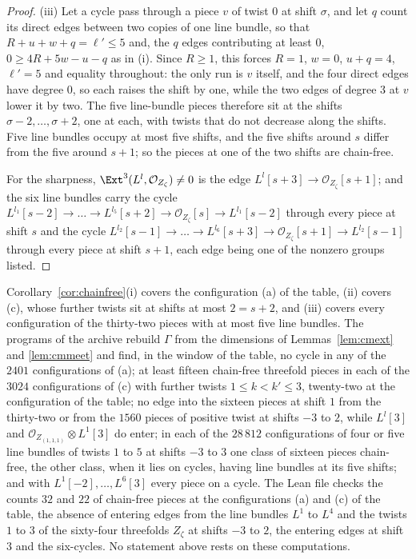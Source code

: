 \begin{proof}
(iii) Let a cycle pass through a piece $v$ of twist $0$ at shift $\sigma$, and let $q$ count its direct edges between two copies of one line bundle, so that $R+u+w+q=\ell'\le5$ and, the $q$ edges contributing at least $0$, $0\ge4R+5w-u-q$ as in (i). Since $R\ge1$, this forces $R=1$, $w=0$, $u+q=4$, $\ell'=5$ and equality throughout: the only run is $v$ itself, and the four direct edges have degree $0$, so each raises the shift by one, while the two edges of degree $3$ at $v$ lower it by two. The five line-bundle pieces therefore sit at the shifts $\sigma-2,\dots,\sigma+2$, one at each, with twists that do not decrease along the shifts. Five line bundles occupy at most five shifts, and the five shifts around $s$ differ from the five around $s+1$; so the pieces at one of the two shifts are chain-free.

For the sharpness, $\Ext^{3}(L^{l},\mathcal{O}_{Z_{\zeta}})\ne0$ is the edge $L^{l}[s+3]\to\mathcal{O}_{Z_{\zeta}}[s+1]$; and the six line bundles carry the cycle $L^{l_{1}}[s-2]\to\dots\to L^{l_{5}}[s+2]\to\mathcal{O}_{Z_{\zeta}}[s]\to L^{l_{1}}[s-2]$ through every piece at shift $s$ and the cycle $L^{l_{2}}[s-1]\to\dots\to L^{l_{6}}[s+3]\to\mathcal{O}_{Z_{\zeta}}[s+1]\to L^{l_{2}}[s-1]$ through every piece at shift $s+1$, each edge being one of the nonzero groups listed.
\end{proof}

\begin{remark}\label{rem:chainfreecount}
Corollary~\ref{cor:chainfree}(i) covers the configuration (a) of the table, (ii) covers (c), whose further twists sit at shifts at most $2=s+2$, and (iii) covers every configuration of the thirty-two pieces with at most five line bundles. The programs of the archive rebuild $\Gamma$ from the dimensions of Lemmas~\ref{lem:cmext} and \ref{lem:cmmeet} and find, in the window of the table, no cycle in any of the $2401$ configurations of (a); at least fifteen chain-free threefold pieces in each of the $3024$ configurations of (c) with further twists $1\le k<k'\le3$, twenty-two at the configuration of the table; no edge into the sixteen pieces at shift $1$ from the thirty-two or from the $1560$ pieces of positive twist at shifts $-3$ to $2$, while $L^{l}[3]$ and $\mathcal{O}_{Z_{(1,1,1)}}\otimes L^{1}[3]$ do enter; in each of the $28\,812$ configurations of four or five line bundles of twists $1$ to $5$ at shifts $-3$ to $3$ one class of sixteen pieces chain-free, the other class, when it lies on cycles, having line bundles at its five shifts; and with $L^{1}[-2],\dots,L^{6}[3]$ every piece on a cycle. The Lean file checks the counts $32$ and $22$ of chain-free pieces at the configurations (a) and (c) of the table, the absence of entering edges from the line bundles $L^{1}$ to $L^{4}$ and the twists $1$ to $3$ of the sixty-four threefolds $Z_{\zeta}$ at shifts $-3$ to $2$, the entering edges at shift $3$ and the six-cycles. No statement above rests on these computations.
\end{remark}

